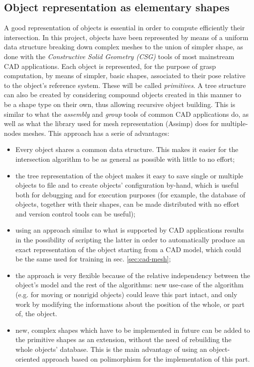 \subsection{Object representation as elementary shapes} \label{sec:shapes}
A good representation of objects is essential in order to compute efficiently
their intersection. In this project, objects have been represented by means of a
uniform data structure breaking down complex meshes to the union of simpler
shape, as done with the \emph{Constructive Solid Geometry (\emph{CSG})} tools of
most mainstream CAD applications. Each object is represented, for the purpose of
grasp computation, by means of simpler, basic shapes, associated to their pose
relative to the object's reference system. These will be called
\emph{primitives}. A tree structure can also be created
by considering compound objects created in this manner to be a shape type on
their own, thus allowing recursive object building. This is similar to what the
\emph{assembly} and \emph{group} tools of common CAD applications do, as well
as what the library used for mesh representation (Assimp) does for
multiple-nodes meshes. This approach has a serie of advantages:
\begin{itemize}
  \item{Every object shares a common data structure. This makes it easier for
      the intersection algorithm to be as general as possible with little to no
    effort;}
  \item{the tree representation of the object makes it easy to save single or
      multiple objects to file and to create objects' configuration by-hand,
      which is useful both for debugging and for execution purposes (for
      example, the database of objects, together with their shapes, can be made
    distributed with no effort and version control tools can be useful);}
  \item{using an approach similar to what is supported by CAD
      applications results in the possibility of scripting the latter in order
      to automatically produce an exact representation of the object starting
      from a CAD model, which could be the same used for training in sec.
    \ref{sec:cad-mesh};}
  \item{the approach is very flexible because of the relative independency
      between the object's model and the rest of the algorithms: new use-case of
      the algorithm (e.g. for moving or nonrigid objects) could leave this part intact, and
      only work by modifying the informations about the position of the whole,
    or part of, the object.}
  \item{new, complex shapes which have to be implemented in future can be added
      to the primitive shapes as an extension, without the need of rebuilding
      the whole objects' database. This is the main advantage of using an
      object-oriented approach based on polimorphism for the implementation of this
    part.}
\end{itemize}

